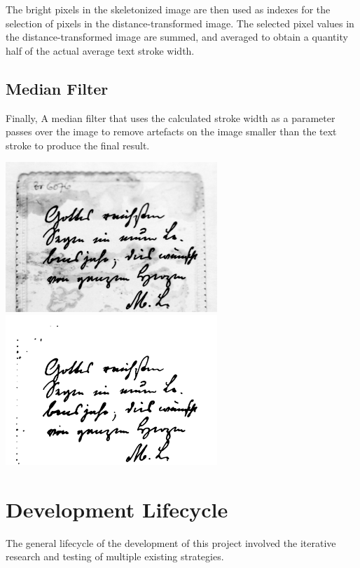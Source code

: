 \documentclass[a4paper, 12pt]{report}
\begin{document}
The bright pixels in the skeletonized image are then used as indexes for the selection of pixels in the distance-transformed image. The selected pixel values in the distance-transformed image are summed, and averaged to obtain a quantity half of the actual average text stroke width.

\subsection{Median Filter}
Finally, A median filter that uses the calculated stroke width as a parameter passes over the image to remove artefacts on the image smaller than the text stroke to produce the final result.

\noindent
\begin{minipage}{\linewidth}
    \centering
    \includegraphics[width=8cm]{original.png}
    \includegraphics[width=8cm]{output.png}
    \label{fig:7}
\end{minipage}

\newpage

\section{Development Lifecycle}
The general lifecycle of the development of this project involved the iterative research and testing of multiple existing strategies.
\end{document}
